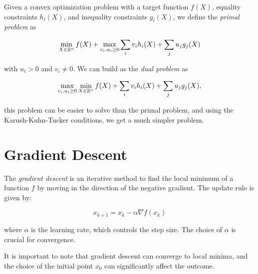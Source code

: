 Given a convex optimization problem with a target function \(f(X)\), equality constraints \(h_i(X)\), and inequality constraints \(g_i(X)\), we 
define the \emph{primal problem} as 

\[
    \min_{X \in \mathbb{R}^n} f(X) + \max_{v_i, u_i \ge 0} \sum_i v_i h_i(X) + \sum_j u_j g_j(X)
\]

with \(u_i > 0\) and \(v_i \ne 0\). We can build as the \emph{dual problem} as

\[
     \max_{v_i, u_i \ge 0}  \min_{X \in \mathbb{R}^n} f(X) + \sum_i v_i h_i(X) + \sum_j u_j g_j(X),
\]

this problem can be easier to solve than the primal problem, and using the Karush-Kuhn-Tucker conditions, we get 
a much simpler problem.

\section{Gradient Descent}

The \emph{gradient descent} is an iterative method to find the local minimum of a function \(f\) by moving in the direction of the negative gradient. 
The update rule is given by:

\[
    x_{k+1} = x_k - \alpha \nabla f(x_k)
\]

where \(\alpha\) is the learning rate, which controls the step size. The choice of \(\alpha\) is crucial for convergence.

It is important to note that gradient descent can converge to local minima, and the choice of the initial point \(x_0\) can significantly affect the outcome.

